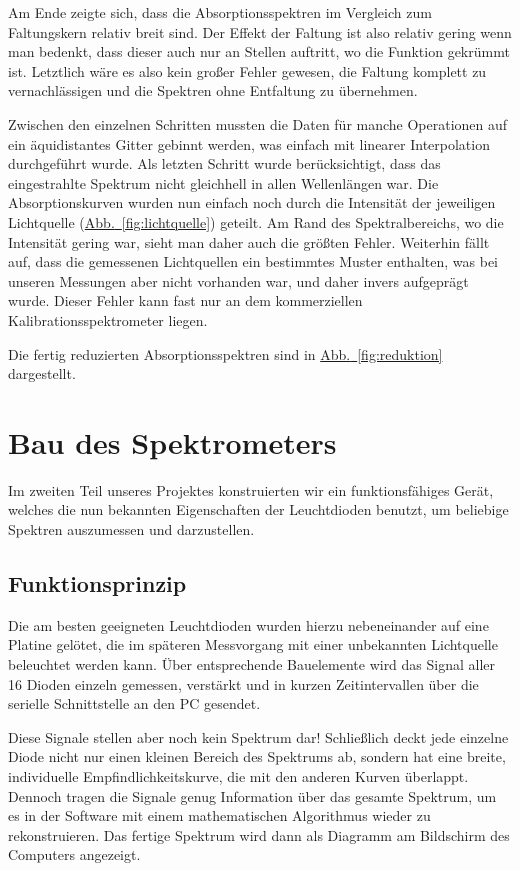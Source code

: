 \documentclass[11pt]{scrartcl}
\newcommand{\hypref}[2]{\hyperref[#2]{{#1}~\ref{#2}}}
\begin{document}
Am Ende zeigte sich, dass die Absorptionsspektren im Vergleich zum Faltungskern relativ breit sind.
Der Effekt der Faltung ist also relativ gering wenn man bedenkt, dass dieser auch nur an Stellen auftritt, wo die Funktion gekrümmt ist.
Letztlich wäre es also kein großer Fehler gewesen, die Faltung komplett zu vernachlässigen und die Spektren ohne Entfaltung zu übernehmen.

Zwischen den einzelnen Schritten mussten die Daten für manche Operationen auf ein äquidistantes Gitter gebinnt werden, was einfach mit linearer Interpolation durchgeführt wurde.
Als letzten Schritt wurde berücksichtigt, dass das eingestrahlte Spektrum nicht gleichhell in allen Wellenlängen war.
Die Absorptionskurven wurden nun einfach noch durch die Intensität der jeweiligen Lichtquelle (\hypref{Abb.}{fig:lichtquelle}) geteilt.
Am Rand des Spektralbereichs, wo die Intensität gering war, sieht man daher auch die größten Fehler.
Weiterhin fällt auf, dass die gemessenen Lichtquellen ein bestimmtes Muster enthalten, was bei unseren Messungen aber nicht vorhanden war, und daher invers aufgeprägt wurde.
Dieser Fehler kann fast nur an dem kommerziellen Kalibrations\-spektrometer liegen.

Die fertig reduzierten Absorptions\-spektren sind in \hypref{Abb.}{fig:reduktion} dargestellt.



\FloatBarrier
\section{Bau des Spektrometers}
Im zweiten Teil unseres Projektes konstruierten wir ein funktionsfähiges Gerät, welches die nun bekannten Eigenschaften der Leuchtdioden benutzt, um beliebige Spektren auszumessen und darzustellen.


\subsection{Funktionsprinzip} %
Die am besten geeigneten  Leuchtdioden wurden hierzu nebeneinander auf eine Platine gelötet, die im späteren Messvorgang mit einer unbekannten Lichtquelle beleuchtet werden kann.
Über entsprechende Bauelemente wird das Signal aller 16 Dioden einzeln gemessen, verstärkt und in kurzen Zeitintervallen über die serielle Schnittstelle an den PC gesendet.

Diese Signale stellen aber noch kein Spektrum dar! Schließlich deckt jede einzelne Diode nicht nur einen kleinen Bereich des Spektrums ab, sondern hat eine breite, individuelle Empfindlichkeitskurve, die mit den anderen Kurven überlappt.
Dennoch tragen die Signale genug Information über das gesamte Spektrum, um es in der Software mit einem mathematischen Algorithmus wieder zu rekonstruieren.
Das fertige Spektrum wird dann als Diagramm am Bildschirm des Computers angezeigt.
\end{document}

